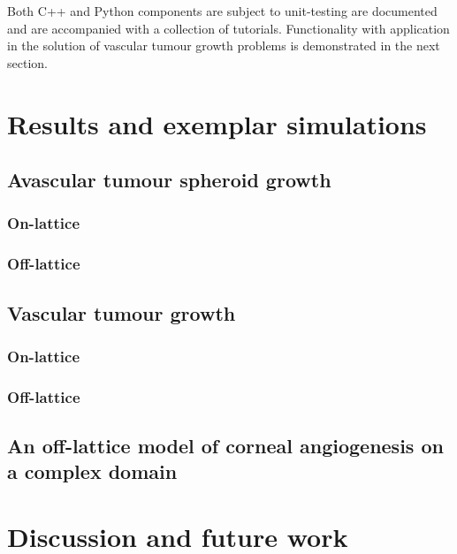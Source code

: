 \documentclass[superscriptaddress, a4paper]{article}
\begin{document}
Both C++ and Python components are subject to unit-testing are documented and are accompanied with a collection of tutorials. Functionality with application in the solution of vascular tumour growth problems is demonstrated in the next section.

\section{Results and exemplar simulations}
\label{sec:results}

\subsection{Avascular tumour spheroid growth}
\label{sec:avascular tumour spheroid growth}

\subsubsection{On-lattice}
\label{sec:on-lattice avascular tumour spheroid growth}



\subsubsection{Off-lattice}
\label{sec:off-lattice avascular tumour spheroid growth}


\subsection{Vascular tumour growth}
\label{sec:vascular tumour growth}

\subsubsection{On-lattice}
\label{sec:on-lattice vascular tumour growth}



\subsubsection{Off-lattice}
\label{sec:off-lattice vascular tumour growth}


\subsection{An off-lattice model of corneal angiogenesis on a complex domain}
\label{sec:an off-lattice model of corneal angiogenesis on a complex domain}


\section{Discussion and future work}
\label{sec:discussion and future work}
\end{document}
